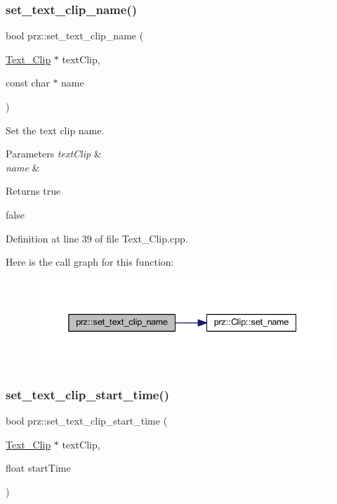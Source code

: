 \subsubsection{\texorpdfstring{set\_text\_clip\_name()}{set\_text\_clip\_name()}}
{\footnotesize\ttfamily bool prz\+::set\+\_\+text\+\_\+clip\+\_\+name (\begin{DoxyParamCaption}\item[{\mbox{\hyperlink{classprz_1_1_text___clip}{Text\+\_\+\+Clip}} $\ast$}]{text\+Clip,  }\item[{const char $\ast$}]{name }\end{DoxyParamCaption})}



Set the text clip name. 


\begin{DoxyParams}{Parameters}
{\em text\+Clip} & \\
\hline
{\em name} & \\
\hline
\end{DoxyParams}
\begin{DoxyReturn}{Returns}
true 

false 
\end{DoxyReturn}


Definition at line 39 of file Text\+\_\+\+Clip.\+cpp.

Here is the call graph for this function\+:
\nopagebreak
\begin{figure}[H]
\begin{center}
\leavevmode
\includegraphics[width=338pt]{namespaceprz_a0f13735aa236bd0a3aff7be58137e6a5_cgraph}
\end{center}
\end{figure}
\mbox{\label{namespaceprz_aa7768ced397410c261e9ac6d1fecade5}} 
\subsubsection{\texorpdfstring{set\_text\_clip\_start\_time()}{set\_text\_clip\_start\_time()}}
{\footnotesize\ttfamily bool prz\+::set\+\_\+text\+\_\+clip\+\_\+start\+\_\+time (\begin{DoxyParamCaption}\item[{\mbox{\hyperlink{classprz_1_1_text___clip}{Text\+\_\+\+Clip}} $\ast$}]{text\+Clip,  }\item[{float}]{start\+Time }\end{DoxyParamCaption})}



